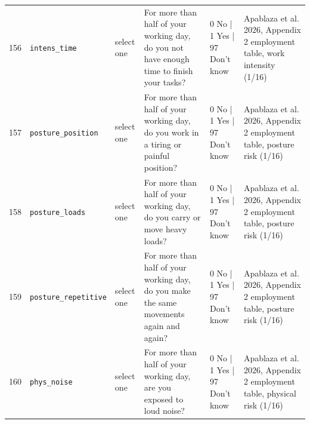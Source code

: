 \documentclass[9pt,a4paper,landscape]{article}
\begin{document}
\begin{longtable}{@{}p{0.5cm}p{3.3cm}p{1.7cm}p{7.3cm}p{5.6cm}p{5.4cm}@{}}
\footnotesize 156 & \footnotesize\texttt{intens\_time} & \scriptsize select one & \footnotesize For more than half of your working day, do you not have enough time to finish your tasks?\par\vspace{1pt}{\footnotesize\color{hdr}{\hifont काम के दिन के आधे से ज़्यादा समय, क्या आपके पास काम पूरा करने के लिए काफ़ी समय नहीं होता?}} & \scriptsize 0 No | 1 Yes | 97 Don't know & \scriptsize Apablaza et al. 2026, Appendix 2 employment table, work intensity (1/16)\\
\footnotesize 157 & \footnotesize\texttt{posture\_position} & \scriptsize select one & \footnotesize For more than half of your working day, do you work in a tiring or painful position?\par\vspace{1pt}{\footnotesize\color{hdr}{\hifont काम के दिन के आधे से ज़्यादा समय, क्या आप थकाने वाली या दर्द वाली स्थिति में काम करते हैं?}} & \scriptsize 0 No | 1 Yes | 97 Don't know & \scriptsize Apablaza et al. 2026, Appendix 2 employment table, posture risk (1/16)\\
\footnotesize 158 & \footnotesize\texttt{posture\_loads} & \scriptsize select one & \footnotesize For more than half of your working day, do you carry or move heavy loads?\par\vspace{1pt}{\footnotesize\color{hdr}{\hifont काम के दिन के आधे से ज़्यादा समय, क्या आप भारी बोझ उठाते या ढोते हैं?}} & \scriptsize 0 No | 1 Yes | 97 Don't know & \scriptsize Apablaza et al. 2026, Appendix 2 employment table, posture risk (1/16)\\
\footnotesize 159 & \footnotesize\texttt{posture\_repetitive} & \scriptsize select one & \footnotesize For more than half of your working day, do you make the same movements again and again?\par\vspace{1pt}{\footnotesize\color{hdr}{\hifont काम के दिन के आधे से ज़्यादा समय, क्या आप एक ही तरह की हरकत बार-बार करते हैं?}} & \scriptsize 0 No | 1 Yes | 97 Don't know & \scriptsize Apablaza et al. 2026, Appendix 2 employment table, posture risk (1/16)\\
\footnotesize 160 & \footnotesize\texttt{phys\_noise} & \scriptsize select one & \footnotesize For more than half of your working day, are you exposed to loud noise?\par\vspace{1pt}{\footnotesize\color{hdr}{\hifont काम के दिन के आधे से ज़्यादा समय, क्या आप तेज़ शोर में रहते हैं?}} & \scriptsize 0 No | 1 Yes | 97 Don't know & \scriptsize Apablaza et al. 2026, Appendix 2 employment table, physical risk (1/16)\\

\end{longtable}
\end{document}
